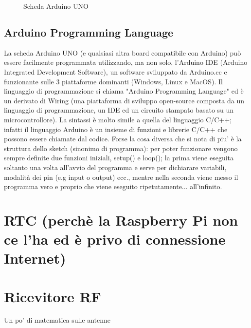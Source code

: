 \documentclass[12pt]{report}
\begin{document}
\begin{figure}
	\caption{Scheda Arduino UNO}
	\label{fig:usecase}
\end{figure}


\subsection{Arduino Programming Language}

La scheda Arduino UNO (e qualsiasi altra board compatibile con Arduino) può essere facilmente programmata utilizzando, ma non solo, l'Arduino IDE (Arduino Integrated Development Software), un software sviluppato da Arduino.cc e funzionante sulle 3 piattaforme dominanti (Windows, Linux e MacOS). Il linguaggio di programmazione si chiama "Arduino Programming Language"\cite{sistemi_embedded_atrent} ed è un derivato di Wiring (una piattaforma di sviluppo open-source composta da un linguaggio di programmazione, un IDE ed un circuito stampato basato su un microcontrollore). La sintassi è molto simile a quella del linguaggio C/C++; infatti il linguaggio Arduino è un insieme di funzioni e librerie C/C++ che possono essere chiamate dal codice. Forse la cosa diversa che si nota di piu' è la struttura dello sketch (sinonimo di programma): per poter funzionare vengono sempre definite due funzioni iniziali, setup() e loop(); la prima viene eseguita soltanto una volta all'avvio del programma e serve per dichiarare variabili, modalità dei pin (e.g input o output) ecc., mentre nella seconda viene messo il programma vero e proprio che viene eseguito ripetutamente... all'infinito.

%
\section{RTC (perchè la Raspberry Pi non ce l'ha ed è privo di connessione Internet)}
%
\section{Ricevitore RF}
Un po' di matematica sulle antenne
%
\end{document}
